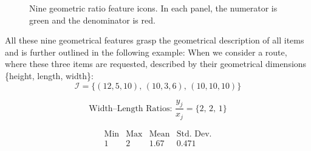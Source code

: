 \begin{figure}[ht]
    \centering

    \vspace{25pt}
    \vspace{25pt}
    \caption[Nine geometric ratio feature icons.]{Nine geometric ratio feature icons. In each panel, the \textcolor{numC}{numerator is green}
        and the \textcolor{denC}{denominator is red}.
        \label{fig:geometrical_ratio_features}}
\end{figure}

All these nine geometrical features grasp the geometrical description of all items and is further outlined in the following example:
When we consider a route, where these three items are requested, described by their geometrical dimensions \{height, length, width\}:
\[
    \mathcal{I} = \{(12,5,10),\,(10,3,6),\,(10,10,10)\}
\]

\[
    \text{Width--Length Ratios: }
    \frac{y_j}{x_j} = \{2,\,2,\,1\}
\]

\[
    \begin{array}{c|c|c|c}
        \text{Min} & \text{Max} & \text{Mean} & \text{Std. Dev.} \\
        \hline
        1          & 2          & 1.67        & 0.471            \\
    \end{array}
\]

